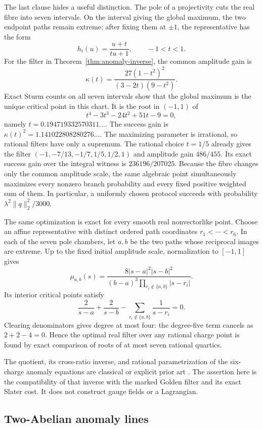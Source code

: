 \documentclass[11pt]{article}
\theoremstyle{definition}
\theoremstyle{remark}
\begin{document}
The last clause hides a useful distinction.  The pole of a projectivity
cuts the real fibre into seven intervals.  On the interval giving the global
maximum, the two endpoint paths remain extreme; after fixing them at
\(\pm1\), the representative has the form
\[
 h_t(u)=\frac{u+t}{tu+1},\qquad -1<t<1.
\]
For the filter in Theorem~\ref{thm:anomaly-inverse}, the common amplitude
gain is
\[
 \kappa(t)=\frac{27(1-t^2)^2}{(3-2t)(9-t^2)}.
\]
Exact Sturm counts on all seven intervals show that the global maximum is
the unique critical point in this chart.  It is the root in \((-1,1)\) of
\[
 t^4-3t^3-24t^2+51t-9=0,
\]
namely \(t=0.194719332570311\ldots\).  The success gain is
\(\kappa(t)^2=1.141022808280276\ldots\).  The maximizing parameter is
irrational, so rational filters have only a supremum.  The rational choice
\(t=1/5\) already gives the filter
\((-1,-7/13,-1/7,1/5,1/2,1)\) and amplitude gain \(486/455\).
Its exact success gain over the integral witness is
\(236196/207025\).
Because the fibre changes only the common amplitude scale, the same
algebraic point simultaneously maximizes every nonzero branch probability
and every fixed positive weighted sum of them.  In particular, a uniformly
chosen protocol succeeds with probability
\(\lambda^2\lVert q\rVert_2^2/3000\).

The same optimization is exact for every smooth real nonvectorlike point.
Choose an affine representative with distinct ordered path coordinates
\(r_1<\cdots<r_6\).  In each of the seven pole chambers, let \(a,b\) be the
two paths whose reciprocal images are extreme.  Up to the fixed initial
amplitude scale, normalization to \([-1,1]\) gives
\[
 \mu_{a,b}(s)=
 \frac{8|s-a|^2|s-b|^2}
 {(b-a)^3\prod_{r_i\notin\{a,b\}}|s-r_i|}.
\]
Its interior critical points satisfy
\[
 \frac2{s-a}+\frac2{s-b}
 -\sum_{r_i\notin\{a,b\}}\frac1{s-r_i}=0.
\]
Clearing denominators gives degree at most four: the degree-five term
cancels as \(2+2-4=0\).  Hence the optimal real filter over any rational
charge point is found by exact comparison of roots of at most seven rational
quartics.

The quotient, its cross-ratio inverse, and rational parametrization of the
six-charge anomaly equations are classical or explicit prior art
\cite{HMSVOuter,CostaDobrescuFox,GripaiosNguyen}.  The assertion here is
the compatibility of that inverse with the marked Golden filter and its
exact Slater cost.  It does not construct gauge fields or a Lagrangian.

\subsection{Two-Abelian anomaly lines}
\end{document}
